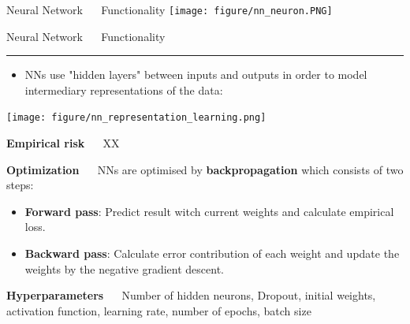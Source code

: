 \documentclass[11pt,compress,t,notes=noshow, xcolor=table]{beamer}
\begin{document}
\begin{frame}{\textcolor{gray!80}{Neural Network} ~~ Functionality}
\medskip
  \centering
  \texttt{[image: figure/nn\_neuron.PNG]}

\end{frame}


\LARGE
\begin{frame}{\textcolor{gray!80}{Neural Network} ~~ Functionality}
\normalsize
\vspace{-0.5cm}
\noindent \textcolor{gray!80}{\rule{\textwidth}{1pt}}

\vspace{0.3cm}

\footnotesize

\begin{itemize}

\item NNs use "hidden layers" between inputs and outputs in order to model intermediary representations of the data: 

\end{itemize}



\medskip
  \centering
  \texttt{[image: figure/nn\_representation\_learning.png]}



\medskip



\textbf{\textcolor{gray!80}{Empirical risk}} ~~ XX

% 
%   
%   
% 
% 
 \medskip

\textbf{\textcolor{gray!80}{Optimization}} ~~ NNs are optimised by \textbf{backpropagation} which consists of two steps:
\begin{itemize}
  \item \textbf{Forward pass}: Predict result witch current weights and calculate empirical loss. 
  \item \textbf{Backward pass}: Calculate error contribution of each weight and update the weights by the negative gradient descent. 
\end{itemize}

\medskip

\textbf{\textcolor{gray!80}{Hyperparameters}} ~~ Number of hidden neurons, Dropout, initial weights, activation function, learning rate, number of epochs, batch size

\end{frame}
\end{document}
